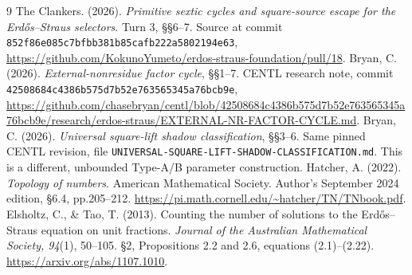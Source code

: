 \begin{thebibliography}{9}
 The Clankers. (2026). \emph{Primitive sextic cycles and square-source escape for the Erd\H{o}s--Straus selectors}. Turn 3, \S\S6--7. Source at commit \texttt{852f86e085c7bfbb381b85cafb222a5802194e63},
\url{https://github.com/KokunoYumeto/erdos-straus-foundation/pull/18}.
 Bryan, C. (2026). \emph{External-nonresidue factor cycle}, \S\S1--7. CENTL research note, commit \texttt{42508684c4386b575d7b52e763565345a76bcb9e},
\url{https://github.com/chasebryan/centl/blob/42508684c4386b575d7b52e763565345a76bcb9e/research/erdos-straus/EXTERNAL-NR-FACTOR-CYCLE.md}.
 Bryan, C. (2026). \emph{Universal square-lift shadow classification}, \S\S3--6. Same pinned CENTL revision, file \texttt{UNIVERSAL-SQUARE-LIFT-SHADOW-CLASSIFICATION.md}. This is a different, unbounded Type-A/B parameter construction.
 Hatcher, A. (2022). \emph{Topology of numbers}. American Mathematical Society. Author's September 2024 edition, \S6.4, pp.205--212.
\url{https://pi.math.cornell.edu/~hatcher/TN/TNbook.pdf}.
 Elsholtz, C., \& Tao, T. (2013). Counting the number of solutions to the Erd\H{o}s--Straus equation on unit fractions. \emph{Journal of the Australian Mathematical Society, 94}(1), 50--105. \S2, Propositions 2.2 and 2.6, equations (2.1)--(2.22). \url{https://arxiv.org/abs/1107.1010}.
\end{thebibliography}
